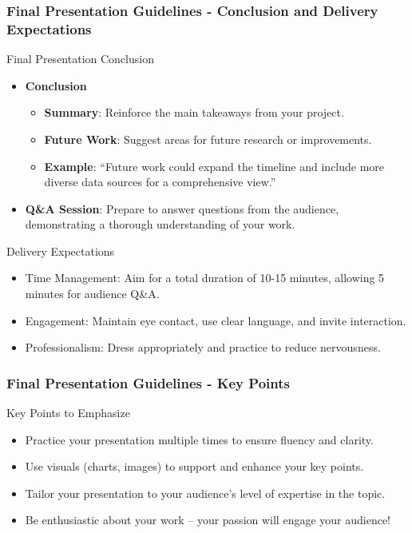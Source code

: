 \documentclass[aspectratio=169]{beamer}
\begin{document}
\begin{frame}[fragile]
    \frametitle{Final Presentation Guidelines - Conclusion and Delivery Expectations}
    \begin{block}{Final Presentation Conclusion}
        \begin{itemize}
            \item \textbf{Conclusion}
                \begin{itemize}
                    \item \textbf{Summary}: Reinforce the main takeaways from your project.
                    \item \textbf{Future Work}: Suggest areas for future research or improvements.
                    \item \textbf{Example}: ``Future work could expand the timeline and include more diverse data sources for a comprehensive view.''
                \end{itemize}
            \item \textbf{Q\&A Session}: Prepare to answer questions from the audience, demonstrating a thorough understanding of your work.
        \end{itemize}
    \end{block}

    \begin{block}{Delivery Expectations}
        \begin{itemize}
            \item Time Management: Aim for a total duration of 10-15 minutes, allowing 5 minutes for audience Q\&A.
            \item Engagement: Maintain eye contact, use clear language, and invite interaction.
            \item Professionalism: Dress appropriately and practice to reduce nervousness.
        \end{itemize}
    \end{block}
\end{frame}

\begin{frame}[fragile]
    \frametitle{Final Presentation Guidelines - Key Points}
    \begin{block}{Key Points to Emphasize}
        \begin{itemize}
            \item Practice your presentation multiple times to ensure fluency and clarity.
            \item Use visuals (charts, images) to support and enhance your key points.
            \item Tailor your presentation to your audience's level of expertise in the topic.
            \item Be enthusiastic about your work – your passion will engage your audience!
        \end{itemize}
    \end{block}
\end{frame}
\end{document}

